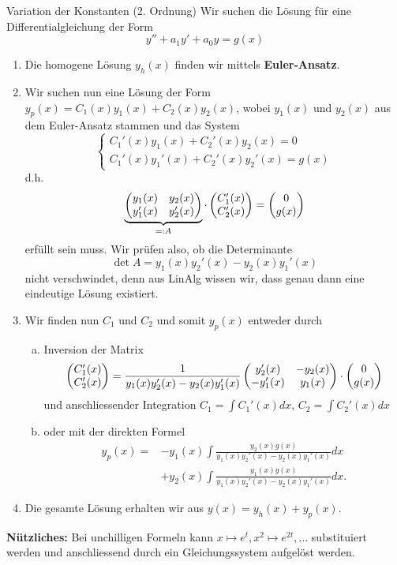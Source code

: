 \begin{Rezept}{Variation der Konstanten (2. Ordnung)}{}
	Wir suchen die Lösung für eine Differentialgleichung der Form
	\begin{equation*}
	y'' + a_1 y' + a_0 y = g(x)
	\end{equation*}
	\begin{enumerate}
		\item Die homogene Lösung $y_h(x)$ finden wir mittels \textbf{Euler-Ansatz}.
		\item Wir suchen nun eine Lösung der Form $y_p(x) = C_1(x) y_1(x) + C_2(x) y_2(x)$, wobei $y_1(x)$ und $y_2(x)$ aus dem Euler-Ansatz stammen und das System
		\begin{equation*}
		\begin{cases} C_1'(x)y_1(x) + C_2'(x)y_2(x)=0\\C_1'(x)y_1'(x) + C_2'(x)y_2'(x)=g(x)\end{cases}
		\end{equation*}
		d.h.
		\begin{equation*}
		\underbrace{\begin{pmatrix}
			y_1(x) &y_2(x)\\y_1'(x) &y_2'(x)
			\end{pmatrix}}_{=:A} \cdot \begin{pmatrix} C_1'(x) \\ C_2'(x)\end{pmatrix} = \begin{pmatrix} 0 \\ g(x)\end{pmatrix}
		\end{equation*}
		erfüllt sein muss. Wir prüfen also, ob die Determinante
		\begin{equation*}
		\det A = y_1(x)y_2'(x)-y_2(x)y_1'(x)
		\end{equation*}
		nicht verschwindet, denn aus LinAlg wissen wir, dass genau dann eine eindeutige Lösung existiert.
		\item  Wir finden nun $C_1$ und $C_2$ und somit $y_p(x)$ entweder durch
		\begin{enumerate}[(a)]
			\item Inversion der Matrix \begin{equation*}
			\begin{pmatrix} C_1'(x) \\ C_2'(x)\end{pmatrix} = \frac{1}{y_1(x)y_2'(x)-y_2(x)y_1'(x)} \begin{pmatrix}
			y_2'(x) & -y_2(x)\\-y_1'(x) &y_1(x)
			\end{pmatrix}\cdot\begin{pmatrix} 0 \\ g(x)\end{pmatrix}
			\end{equation*}
			und anschliessender Integration $C_1 = \int C_1'(x) dx$, $C_2 = \int C_2'(x) dx$ 
			\item oder mit der direkten Formel
			\begin{align*}
			y_p(x) = &-y_1(x) \int \frac{y_2(x) g(x)}{y_1(x)y_2'(x)-y_2(x)y_1'(x)} dx\\&+ y_2(x) \int \frac{y_1(x) g(x)}{y_1(x)y_2'(x)-y_2(x)y_1'(x)}dx.
			\end{align*}
		\end{enumerate}
		\item Die gesamte Lösung erhalten wir aus $y(x) = y_h(x) + y_p(x)$.
	\end{enumerate}
	
	\textbf{Nützliches:} Bei unchilligen Formeln kann $x\mapsto e^t, x^2\mapsto e^{2t},...$ substituiert werden und anschliessend durch ein Gleichungssystem aufgelöst werden.
\end{Rezept}

